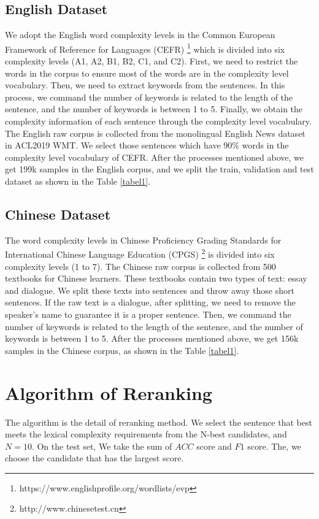 \documentclass[11pt]{article}
\begin{document}
\subsection{English Dataset}
We adopt the English word complexity levels in the Common European Framework of Reference for Languages (CEFR) \footnote{https://www.englishprofile.org/wordlists/evp} which is divided into six complexity levels (A1, A2, B1, B2, C1, and C2). First, we need to restrict the words in the corpus to ensure most of the words are in the complexity level vocabulary. Then, we need to extract keywords from the sentences. In this process, we command the number of keywords is related to the length of the sentence, and the number of keywords is between 1 to 5. Finally, we obtain the complexity information of each sentence through the complexity level vocabulary. The English raw corpus is collected from the monolingual English News dataset in ACL2019 WMT. We select those sentences which have 90\% words in the complexity level vocabulary of CEFR. After the processes mentioned above, we get 199k samples in the English corpus, and we split the train, validation and test dataset as shown in the Table \ref{tabel1}.
\subsection{Chinese Dataset}
The word complexity levels in Chinese Proficiency Grading Standards for International Chinese Language Education (CPGS) \footnote{http://www.chinesetest.cn} is divided into six complexity levels (1 to 7). The Chinese raw corpus is collected from 500 textbooks for Chinese learners. These textbooks contain two types of text: essay and dialogue. We split these texts into sentences and throw away those short sentences. If the raw text is a dialogue, after splitting, we need to remove the speaker's name to guarantee it is a proper sentence. Then, we command the number of keywords is related to the length of the sentence, and the number of keywords is between 1 to 5.  After the processes mentioned above, we get 156k samples in the Chinese corpus, as shown in the Table \ref{tabel1}.

\section{Algorithm of Reranking} \label{algorithm}

The algorithm is the detail of reranking method. We select the sentence that best meets the lexical complexity requirements from the N-best candidates, and $N=10$. On the test set, We take the sum of $ACC$ score and $F1$ score. The, we choose the candidate that has the largest score.
\end{document}
